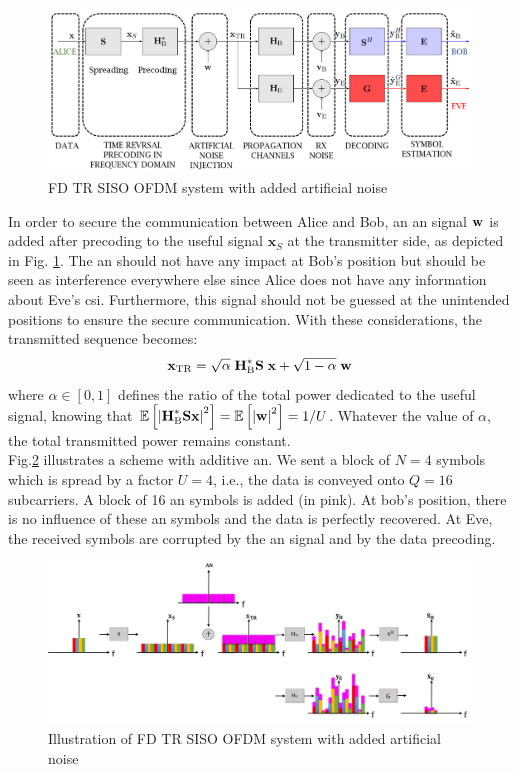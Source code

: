 \begin{figure}[htb!]
    \centering
    \includegraphics[width=1\linewidth]{img/com_scheme_an.PNG}
    \caption{FD TR SISO OFDM system with added artificial noise}
    \label{fig:TR_FD_AN}
\end{figure} 
In order to secure the communication between Alice and Bob, an \gls{an} signal $\textbf{w}$ is added after precoding to the useful signal $\textbf{x}_S$ at the transmitter side, as depicted in Fig. \ref{fig:TR_FD_AN}. The \gls{an} should not have any impact at Bob's position but should be seen as interference everywhere else since Alice does not have any information about Eve's \gls{csi}. Furthermore, this signal should not be guessed at the unintended positions to ensure the secure communication. With these considerations, the transmitted sequence becomes:
\begin{equation}
    \textbf{x}_{\text{TR}} = \sqrt{\alpha} \;\textbf{H}_{\text{B}}^*  \textbf{S}\; \textbf{x} +  \sqrt{1-\alpha} \; \textbf{w}
    \label{eq:sym_rad_AN}
\end{equation} 
where $\alpha \in [0,1]$ defines the ratio of the total power dedicated to the useful signal, knowing that $\mathbb{E} \left[\left|\textbf{H}_{\text{B}}^*\textbf{S}\textbf{x}\right|^2\right] = \mathbb{E} \left[\left|\textbf{w}\right|^2\right] = 1/U$. Whatever the value of $\alpha$, the total transmitted power remains constant.\\

Fig.\ref{fig:AN_illustration} illustrates a scheme with additive \gls{an}. We sent a block of $N=4$ symbols which is spread by a factor $U=4$, i.e., the data is conveyed onto $Q=16$ subcarriers. A block of 16 \gls{an} symbols is added (in pink). At bob's position, there is no influence of these \gls{an} symbols and the data is perfectly recovered. At Eve, the received symbols are corrupted by the \gls{an} signal and by the data precoding.
\begin{figure}[h!]
    \centering
    \includegraphics[width=1\linewidth]{img/scheme_AN_illustration.png}
    \caption{Illustration of FD TR SISO OFDM system with added artificial noise}
    \label{fig:AN_illustration}
\end{figure} 


